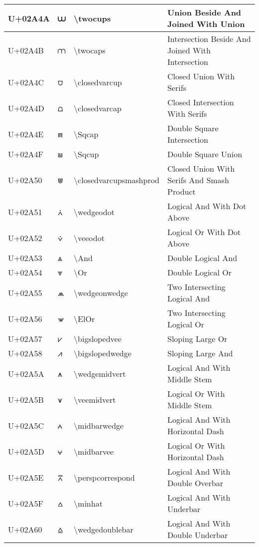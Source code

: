 \begin{table}[h]
\begin{tabulary}{\linewidth}{|L|L|L|L|}
\hline
U+02A4A & ⩊ & {\textbackslash}twocups & Union Beside And Joined With Union \\
\hline
U+02A4B & ⩋ & {\textbackslash}twocaps & Intersection Beside And Joined With Intersection \\
\hline
U+02A4C & ⩌ & {\textbackslash}closedvarcup & Closed Union With Serifs \\
\hline
U+02A4D & ⩍ & {\textbackslash}closedvarcap & Closed Intersection With Serifs \\
\hline
U+02A4E & ⩎ & {\textbackslash}Sqcap & Double Square Intersection \\
\hline
U+02A4F & ⩏ & {\textbackslash}Sqcup & Double Square Union \\
\hline
U+02A50 & ⩐ & {\textbackslash}closedvarcupsmashprod & Closed Union With Serifs And Smash Product \\
\hline
U+02A51 & ⩑ & {\textbackslash}wedgeodot & Logical And With Dot Above \\
\hline
U+02A52 & ⩒ & {\textbackslash}veeodot & Logical Or With Dot Above \\
\hline
U+02A53 & ⩓ & {\textbackslash}And & Double Logical And \\
\hline
U+02A54 & ⩔ & {\textbackslash}Or & Double Logical Or \\
\hline
U+02A55 & ⩕ & {\textbackslash}wedgeonwedge & Two Intersecting Logical And \\
\hline
U+02A56 & ⩖ & {\textbackslash}ElOr & Two Intersecting Logical Or \\
\hline
U+02A57 & ⩗ & {\textbackslash}bigslopedvee & Sloping Large Or \\
\hline
U+02A58 & ⩘ & {\textbackslash}bigslopedwedge & Sloping Large And \\
\hline
U+02A5A & ⩚ & {\textbackslash}wedgemidvert & Logical And With Middle Stem \\
\hline
U+02A5B & ⩛ & {\textbackslash}veemidvert & Logical Or With Middle Stem \\
\hline
U+02A5C & ⩜ & {\textbackslash}midbarwedge & Logical And With Horizontal Dash \\
\hline
U+02A5D & ⩝ & {\textbackslash}midbarvee & Logical Or With Horizontal Dash \\
\hline
U+02A5E & ⩞ & {\textbackslash}perspcorrespond & Logical And With Double Overbar \\
\hline
U+02A5F & ⩟ & {\textbackslash}minhat & Logical And With Underbar \\
\hline
U+02A60 & ⩠ & {\textbackslash}wedgedoublebar & Logical And With Double Underbar \\

\end{tabulary}
\end{table}
